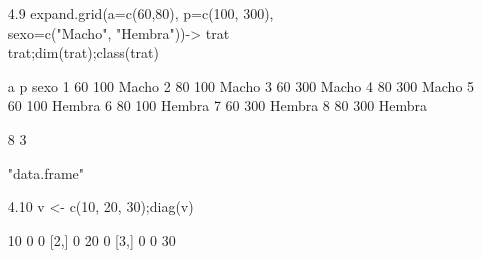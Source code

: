 \documentclass[letterpaper, 12pt]{article}
\begin{document}
\begin{enumerate}
\begin{enumerate}
\item[4.9] expand.grid(a=c(60,80), p=c(100, 300),\\
sexo=c("Macho", "Hembra"))-> trat\\
trat;dim(trat);class(trat)

\begin{Schunk}
\begin{Soutput}
   a   p   sexo
1 60 100  Macho
2 80 100  Macho
3 60 300  Macho
4 80 300  Macho
5 60 100 Hembra
6 80 100 Hembra
7 60 300 Hembra
8 80 300 Hembra
\end{Soutput}
\begin{Soutput}
[1] 8 3
\end{Soutput}
\begin{Soutput}
[1] "data.frame"
\end{Soutput}
\end{Schunk}

\item[4.10] v <- c(10, 20, 30);diag(v)
\begin{Schunk}
\begin{Soutput}
     [,1] [,2] [,3]
[1,]   10    0    0
[2,]    0   20    0
[3,]    0    0   30
\end{Soutput}
\end{Schunk}

\end{enumerate}
\end{enumerate}
\end{document}
